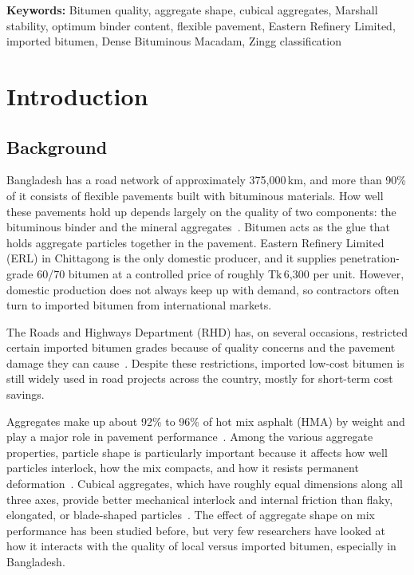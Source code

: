 \documentclass[12pt,a4paper]{article}
\begin{document}
\vspace{0.5cm}
\noindent\textbf{Keywords:} Bitumen quality, aggregate shape, cubical aggregates, Marshall stability, optimum binder content, flexible pavement, Eastern Refinery Limited, imported bitumen, Dense Bituminous Macadam, Zingg classification

\clearpage
{}
\setcounter{page}{1}
\section{Introduction}

\subsection{Background}

Bangladesh has a road network of approximately 375,000\,km, and more than 90\% of it consists of flexible pavements built with bituminous materials. How well these pavements hold up depends largely on the quality of two components: the bituminous binder and the mineral aggregates~\cite{werkineh2020assessment}. Bitumen acts as the glue that holds aggregate particles together in the pavement. Eastern Refinery Limited (ERL) in Chittagong is the only domestic producer, and it supplies penetration-grade 60/70 bitumen at a controlled price of roughly Tk\,6,300 per unit. However, domestic production does not always keep up with demand, so contractors often turn to imported bitumen from international markets.

The Roads and Highways Department (RHD) has, on several occasions, restricted certain imported bitumen grades because of quality concerns and the pavement damage they can cause~\cite{imran2025developing}. Despite these restrictions, imported low-cost bitumen is still widely used in road projects across the country, mostly for short-term cost savings.

Aggregates make up about 92\% to 96\% of hot mix asphalt (HMA) by weight and play a major role in pavement performance~\cite{rajkumar2018experimental}. Among the various aggregate properties, particle shape is particularly important because it affects how well particles interlock, how the mix compacts, and how it resists permanent deformation~\cite{teja2020effect}. Cubical aggregates, which have roughly equal dimensions along all three axes, provide better mechanical interlock and internal friction than flaky, elongated, or blade-shaped particles~\cite{sumanth2017study}. The effect of aggregate shape on mix performance has been studied before, but very few researchers have looked at how it interacts with the quality of local versus imported bitumen, especially in Bangladesh.
\end{document}
